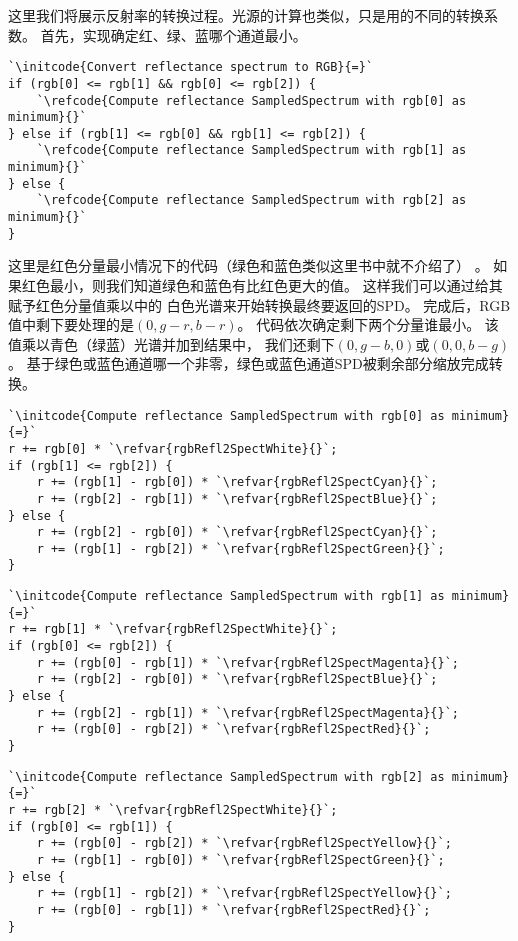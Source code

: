 这里我们将展示反射率的转换过程。光源的计算也类似，只是用的不同的转换系数。
首先，实现确定红、绿、蓝哪个通道最小。
\begin{lstlisting}
`\initcode{Convert reflectance spectrum to RGB}{=}`
if (rgb[0] <= rgb[1] && rgb[0] <= rgb[2]) {
    `\refcode{Compute reflectance SampledSpectrum with rgb[0] as minimum}{}`
} else if (rgb[1] <= rgb[0] && rgb[1] <= rgb[2]) {
    `\refcode{Compute reflectance SampledSpectrum with rgb[1] as minimum}{}`
} else {
    `\refcode{Compute reflectance SampledSpectrum with rgb[2] as minimum}{}`
}
\end{lstlisting}

这里是红色分量最小情况下的代码（绿色和蓝色类似这里书中就不介绍了）
。
如果红色最小，则我们知道绿色和蓝色有比红色更大的值。
这样我们可以通过给其赋予红色分量值乘以中的
白色光谱来开始转换最终要返回的SPD。
完成后，RGB值中剩下要处理的是$(0,g-r,b-r)$。
代码依次确定剩下两个分量谁最小。
该值乘以青色（绿蓝）光谱并加到结果中，
我们还剩下$(0,g-b,0)$或$(0,0,b-g)$。
基于绿色或蓝色通道哪一个非零，绿色或蓝色通道SPD被剩余部分缩放完成转换。
\begin{lstlisting}
`\initcode{Compute reflectance SampledSpectrum with rgb[0] as minimum}{=}`
r += rgb[0] * `\refvar{rgbRefl2SpectWhite}{}`;
if (rgb[1] <= rgb[2]) {
    r += (rgb[1] - rgb[0]) * `\refvar{rgbRefl2SpectCyan}{}`;
    r += (rgb[2] - rgb[1]) * `\refvar{rgbRefl2SpectBlue}{}`;
} else {
    r += (rgb[2] - rgb[0]) * `\refvar{rgbRefl2SpectCyan}{}`;
    r += (rgb[1] - rgb[2]) * `\refvar{rgbRefl2SpectGreen}{}`;
}
\end{lstlisting}
\begin{lstlisting}
`\initcode{Compute reflectance SampledSpectrum with rgb[1] as minimum}{=}`
r += rgb[1] * `\refvar{rgbRefl2SpectWhite}{}`;
if (rgb[0] <= rgb[2]) {
    r += (rgb[0] - rgb[1]) * `\refvar{rgbRefl2SpectMagenta}{}`;
    r += (rgb[2] - rgb[0]) * `\refvar{rgbRefl2SpectBlue}{}`;
} else {
    r += (rgb[2] - rgb[1]) * `\refvar{rgbRefl2SpectMagenta}{}`;
    r += (rgb[0] - rgb[2]) * `\refvar{rgbRefl2SpectRed}{}`;
}
\end{lstlisting}
\begin{lstlisting}
`\initcode{Compute reflectance SampledSpectrum with rgb[2] as minimum}{=}`
r += rgb[2] * `\refvar{rgbRefl2SpectWhite}{}`;
if (rgb[0] <= rgb[1]) {
    r += (rgb[0] - rgb[2]) * `\refvar{rgbRefl2SpectYellow}{}`;
    r += (rgb[1] - rgb[0]) * `\refvar{rgbRefl2SpectGreen}{}`;
} else {
    r += (rgb[1] - rgb[2]) * `\refvar{rgbRefl2SpectYellow}{}`;
    r += (rgb[0] - rgb[1]) * `\refvar{rgbRefl2SpectRed}{}`;
}
\end{lstlisting}

